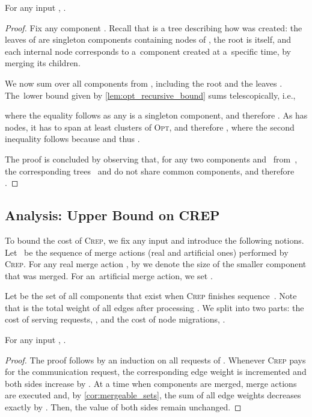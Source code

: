 \documentclass{siamart190516}
\newcommand{\OPT}{\textsc{Opt}\xspace}
\newcommand{\CREP}{\textsc{Crep}\xspace}
\begin{document}
\begin{lemma}
\label{lem:opt_lower_bound}
For any input , .
\end{lemma}

\begin{proof}
Fix any component . Recall that  is a tree
describing how  was created: the leaves of  are singleton
components containing nodes of , the root is  itself, and each internal
node corresponds to a~component created at a~specific time, by merging its
children.

We now sum  over all components  from , including 
the root  and the leaves . The~lower bound given 
by \cref{lem:opt_recursive_bound} sums telescopically, i.e.,

where the equality follows as any  is a singleton component,
and therefore . As  has  nodes, it has to span at least
 clusters of \OPT, and therefore , where the second inequality follows because  and
thus .

The proof is concluded by observing that, for any two components 
and~ from~, the corresponding trees~ and  do not share common
components, and therefore .
\end{proof}


\subsection{Analysis: Upper Bound on CREP}
\label{sec:crep_upper}

To bound the cost of \CREP, we fix any input  and introduce the following 
notions. Let~ be the sequence of merge actions 
(real and artificial ones) performed by \CREP. 
For any real merge action , by
 we denote the size of the smaller component that was
merged. For an~artificial merge action, we set .

Let  be the set of all components that exist when \CREP finishes
sequence~. Note that  is the total weight of all
edges after processing . We split 
 into two parts: the cost of serving requests, , 
and the cost of node migrations, . 

\begin{lemma}
\label{lem:crep_req}
For any input , .
\end{lemma}

\begin{proof}
The proof follows by an induction on all requests of . Whenever \CREP
pays for the communication request, the corresponding edge weight is incremented
and both sides increase by . At a time when  components are merged, 
merge actions are executed and, by \cref{cor:mergeable_sets}, the sum of all
edge weights decreases exactly by . Then, the value of both
sides remain unchanged.
\end{proof}
\end{document}
